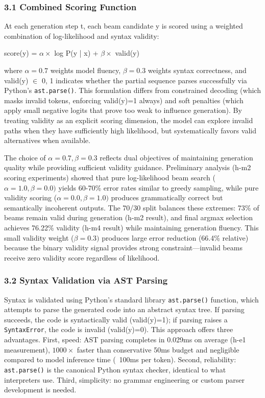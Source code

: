 
\subsubsection{3.1 Combined Scoring Function}

At each generation step t, each beam candidate y is scored using a weighted combination of log-likelihood and syntax validity:

score(y) = $\alpha \times$ log P(y | x) + $\beta \times$ valid(y)

where $\alpha =0.7$ weights model fluency, $\beta =0.3$ weights syntax correctness, and valid(y) $\in$ {0, 1} indicates whether the partial sequence parses successfully via Python's \texttt{ast.parse()}. This formulation differs from constrained decoding (which masks invalid tokens, enforcing valid(y)=1 always) and soft penalties (which apply small negative logits that prove too weak to influence generation). By treating validity as an explicit scoring dimension, the model can explore invalid paths when they have sufficiently high likelihood, but systematically favors valid alternatives when available.

The choice of $\alpha =0.7, \beta =0.3$ reflects dual objectives of maintaining generation quality while providing sufficient validity guidance. Preliminary analysis (h-m2 scoring experiments) showed that pure log-likelihood beam search ($\alpha =1.0, \beta =0.0)$ yields 60-70\% error rates similar to greedy sampling, while pure validity scoring ($\alpha =0.0, \beta =1.0)$ produces grammatically correct but semantically incoherent outputs. The 70/30 split balances these extremes: 73\% of beams remain valid during generation (h-m2 result), and final argmax selection achieves 76.22\% validity (h-m4 result) while maintaining generation fluency. This small validity weight ($\beta =0.3)$ produces large error reduction (66.4\% relative) because the binary validity signal provides strong constraint---invalid beams receive zero validity score regardless of likelihood.

\subsubsection{3.2 Syntax Validation via AST Parsing}

Syntax is validated using Python's standard library \texttt{ast.parse()} function, which attempts to parse the generated code into an abstract syntax tree. If parsing succeeds, the code is syntactically valid (valid(y)=1); if parsing raises a \texttt{SyntaxError}, the code is invalid (valid(y)=0). This approach offers three advantages. First, speed: AST parsing completes in 0.029ms on average (h-e1 measurement), $1000\times$ faster than conservative 50ms budget and negligible compared to model inference time (~100ms per token). Second, reliability: \texttt{ast.parse()} is the canonical Python syntax checker, identical to what interpreters use. Third, simplicity: no grammar engineering or custom parser development is needed.

